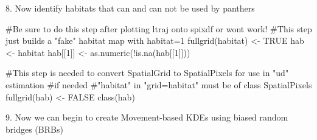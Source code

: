 \documentclass[
  letterpaper,
]{book}
\newenvironment{Shaded}{\begin{snugshade}}{\end{snugshade}}
\newcommand{\CommentTok}[1]{\textcolor[rgb]{0.37,0.37,0.37}{#1}}
\newcommand{\ConstantTok}[1]{\textcolor[rgb]{0.56,0.35,0.01}{#1}}
\newcommand{\DecValTok}[1]{\textcolor[rgb]{0.68,0.00,0.00}{#1}}
\newcommand{\FunctionTok}[1]{\textcolor[rgb]{0.28,0.35,0.67}{#1}}
\newcommand{\NormalTok}[1]{\textcolor[rgb]{0.00,0.23,0.31}{#1}}
\newcommand{\OtherTok}[1]{\textcolor[rgb]{0.00,0.23,0.31}{#1}}
\newcommand{\SpecialCharTok}[1]{\textcolor[rgb]{0.37,0.37,0.37}{#1}}
\begin{document}
\begin{Shaded}
\end{Shaded}

8. Now identify habitats that can and can not be used by panthers

\begin{Shaded}
\begin{Highlighting}[]
\CommentTok{\#Be sure to do this step after plotting ltraj onto spixdf or won\textquotesingle{}t work!}
\CommentTok{\#This step just builds a "fake" habitat map with habitat=1}
\FunctionTok{fullgrid}\NormalTok{(habitat) }\OtherTok{\textless{}{-}} \ConstantTok{TRUE}
\NormalTok{hab }\OtherTok{\textless{}{-}}\NormalTok{ habitat}
\NormalTok{hab[[}\DecValTok{1}\NormalTok{]] }\OtherTok{\textless{}{-}} \FunctionTok{as.numeric}\NormalTok{(}\SpecialCharTok{!}\FunctionTok{is.na}\NormalTok{(hab[[}\DecValTok{1}\NormalTok{]])) }

\CommentTok{\#This step is needed to convert SpatialGrid to SpatialPixels for use in "ud" estimation }
\CommentTok{\#if needed}
\CommentTok{\#"habitat" in "grid=habitat" must be of class SpatialPixels}
\FunctionTok{fullgrid}\NormalTok{(hab) }\OtherTok{\textless{}{-}} \ConstantTok{FALSE}
\FunctionTok{class}\NormalTok{(hab)}
\end{Highlighting}
\end{Shaded}

9. Now we can begin to create Movement-based KDEs using biased random
bridges (BRBs)
\end{document}
